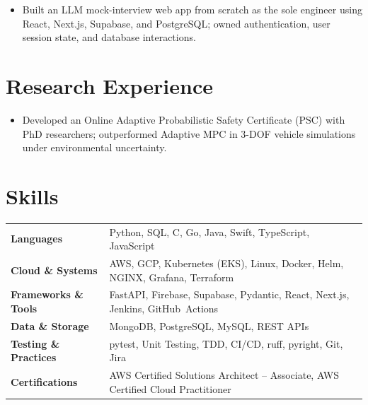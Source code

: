 \documentclass[11pt, letterpaper]{article}
\begin{document}
\begin{itemize}
  \item Built an LLM mock-interview web app from scratch as the sole engineer using React, Next.js, Supabase, and PostgreSQL; owned authentication, user session state, and database interactions.
\end{itemize}

\section{Research Experience}
\begin{itemize}
  \item Developed an Online Adaptive Probabilistic Safety Certificate (PSC) with PhD researchers; outperformed Adaptive MPC in 3-DOF vehicle simulations under environmental uncertainty.
\end{itemize}

\section{Skills}
\begin{tabularx}{\textwidth}{@{}l @{\hspace{7pt}} >{\raggedright\arraybackslash}X@{}}
  \textbf{Languages} & Python, SQL, C, Go, Java, Swift, TypeScript, JavaScript \\[1pt]
  \textbf{Cloud \& Systems} & AWS, GCP, Kubernetes (EKS), Linux, Docker, Helm, NGINX, Grafana, Terraform \\[1pt]
  \textbf{Frameworks \& Tools} & FastAPI, Firebase, Supabase, Pydantic, React, Next.js, Jenkins, GitHub~Actions \\[1pt]
  \textbf{Data \& Storage} & MongoDB, PostgreSQL, MySQL, REST APIs \\[1pt]
  \textbf{Testing \& Practices} & pytest, Unit Testing, TDD, CI/CD, ruff, pyright, Git, Jira \\[1pt]
  \textbf{Certifications} & AWS Certified Solutions Architect -- Associate, AWS Certified Cloud Practitioner \\
\end{tabularx}
\end{document}
